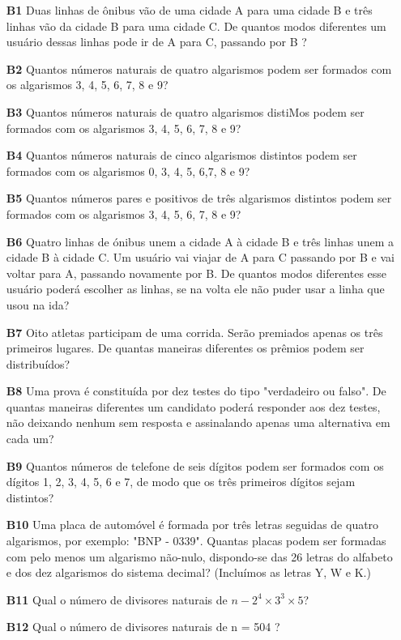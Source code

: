 \documentclass[a4paper,12pt]{article}
\begin{document}
\begin{enumerate}

\item[\textbf{B1}] Duas linhas de ônibus vão de uma cidade A para uma cidade B e três linhas vão da cidade B para uma cidade C. De quantos modos diferentes um usuário dessas linhas pode ir de A para C, passando por B ?
  
\item[\textbf{B2}] Quantos números naturais de quatro algarismos podem ser formados com os algarismos 3, 4, 5, 6, 7, 8 e 9?

\item[\textbf{B3}] Quantos números naturais de quatro algarismos distiMos podem ser formados com os algarismos 3, 4, 5, 6, 7, 8 e 9?

\item[\textbf{B4}] Quantos números naturais de cinco algarismos distintos podem ser formados com os algarismos 0, 3, 4, 5, 6,7, 8 e 9?

\item[\textbf{B5}] Quantos números pares e positivos de três algarismos distintos podem ser formados com os algarismos 3, 4, 5, 6, 7, 8 e 9?

\item[\textbf{B6}] Quatro linhas de ónibus unem a cidade A à cidade B e três linhas unem a cidade B à cidade C. Um usuário vai viajar de A para C passando por B e vai voltar para A, passando novamente por B. De quantos modos diferentes esse usuário poderá escolher as linhas, se na volta ele não puder usar a linha que usou na ida? 

\item[\textbf{B7}] Oito atletas participam de uma corrida. Serão premiados apenas os três primeiros lugares. De quantas maneiras diferentes os prêmios podem ser distribuídos? 

\item[\textbf{B8}] Uma prova é constituída por dez testes do tipo "verdadeiro ou falso". De quantas maneiras diferentes um candidato poderá responder aos dez testes, não deixando nenhum sem resposta e assinalando apenas uma alternativa em cada um? 

\item[\textbf{B9}] Quantos números de telefone de seis dígitos podem ser formados com os dígitos 1, 2, 3, 4, 5, 6 e 7, de modo que os três primeiros dígitos sejam distintos? 

\item[\textbf{B10}] Uma placa de automóvel é formada por três letras seguidas de quatro algarismos, por exemplo: "BNP - 0339". Quantas placas podem ser formadas com pelo menos um algarismo não-nulo, dispondo-se das 26 letras do alfabeto e dos dez algarismos do sistema decimal? (Incluímos as letras Y, W e K.) 

\item[\textbf{B11}] Qual o número de divisores naturais de $n - 2^4 \times 3^3 \times 5$? 

\item[\textbf{B12}] Qual o número de divisores naturais de n = 504 ?  

\end{enumerate}
\end{document}
